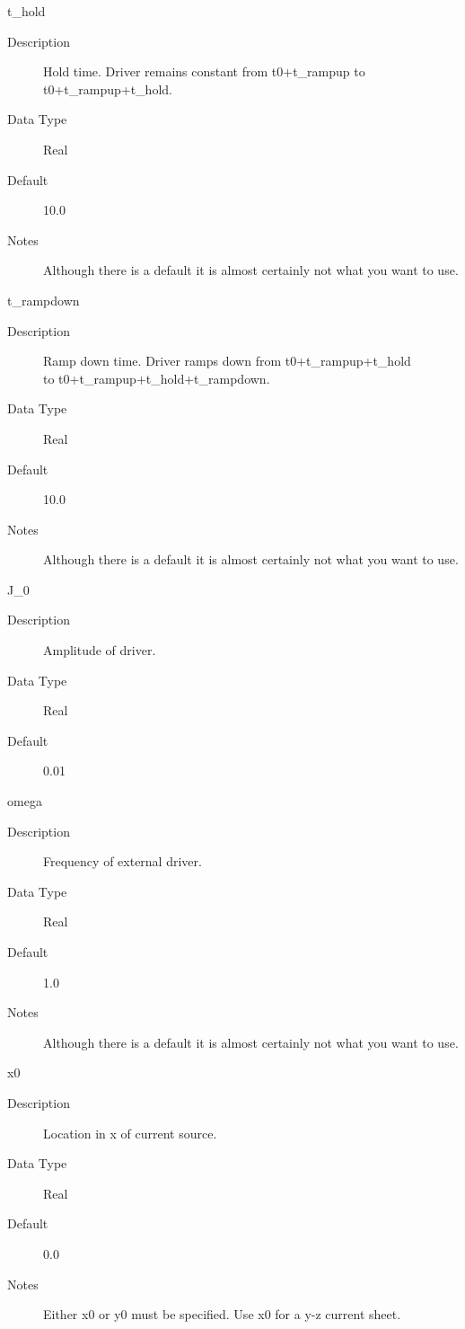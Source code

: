 \documentclass[11pt]{amsart}
\begin{document}
t\_hold
\begin{description}
\item [Description] Hold time.  Driver remains constant from t0+t\_rampup to \\
t0+t\_rampup+t\_hold.
\item [Data Type] Real
\item [Default] 10.0
\item [Notes] Although there is a default it is almost certainly not what you
want to use.
\end{description}

t\_rampdown
\begin{description}
\item [Description] Ramp down time.  Driver ramps down from t0+t\_rampup+t\_hold \\
to t0+t\_rampup+t\_hold+t\_rampdown.
\item [Data Type] Real
\item [Default] 10.0
\item [Notes] Although there is a default it is almost certainly not what you
want to use.
\end{description}

J\_0
\begin{description}
\item [Description] Amplitude of driver.
\item [Data Type] Real
\item [Default] 0.01
\end{description}

omega
\begin{description}
\item [Description] Frequency of external driver.
\item [Data Type] Real
\item [Default] 1.0
\item [Notes] Although there is a default it is almost certainly not what you
want to use.
\end{description}

x0
\begin{description}
\item [Description] Location in x of current source.
\item [Data Type] Real
\item [Default] 0.0
\item [Notes] Either x0 or y0 must be specified.  Use x0 for a y-z current
sheet.
\end{description}
\end{document}
